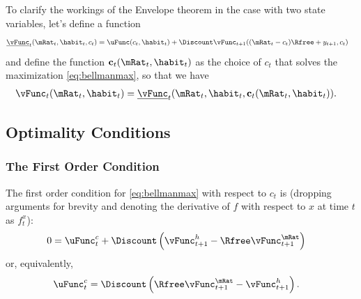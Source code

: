 To clarify the workings of the Envelope theorem in the case with two state
variables, let's define a function 
\begin{equation}\begin{gathered}\begin{aligned}
        \underline{\vFunc}_{t}(\mRat_{t},\habit_{t},c_{t}) & =  \uFunc(c_{t},\habit_{t})
        +\Discount \vFunc_{t+1}((\mRat_{t}-c_{t})\Rfree+y_{t+1},c_{t})
\end{aligned}\end{gathered}\end{equation}
and define the function $\mathbf{c}_{t}(\mRat_{t},\habit_{t})$ as the choice of
$c_{t}$ that solves the maximization \eqref{eq:bellmanmax}, so that
we have
\begin{equation}\begin{gathered}\begin{aligned}
        \vFunc_{t}(\mRat_{t},\habit_{t}) & =  \underline{\vFunc}_{t}(\mRat_{t},\habit_{t},\mathbf{c}_{t}(\mRat_{t},\habit_{t})).
\end{aligned}\end{gathered}\end{equation}

\subsection{Optimality Conditions}

\subsubsection{The First Order Condition}

The first order condition for \eqref{eq:bellmanmax} with respect to
$c_{t}$ is (dropping arguments for brevity and denoting the derivative
of $f$ with respect to $x$ at time $t$ as $f^{x}_{t}$):
\begin{equation}\begin{gathered}\begin{aligned}
0 & =  \uFunc^{c}_{t} + \Discount \left(\vFunc^{h}_{t+1} - \Rfree \vFunc^{\mRat}_{t+1} \right)  \label{eq:ctfocraw}
\end{aligned}\end{gathered}\end{equation}
or, equivalently,
\begin{equation}\begin{gathered}\begin{aligned}
\uFunc^{c}_{t} & =  \Discount \left(\Rfree \vFunc_{t+1}^{\mRat}- \vFunc_{t+1}^{h}\right). \label{eq:ctfoc}
\end{aligned}\end{gathered}\end{equation}

